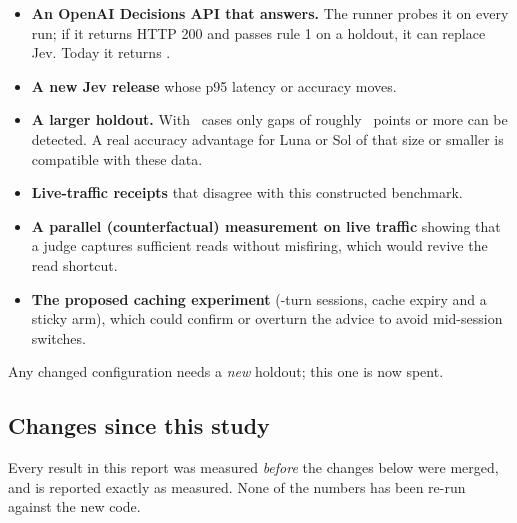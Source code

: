 \begin{itemize}
  \item \textbf{An OpenAI Decisions API that answers.} The runner probes it on every run; if it returns
    HTTP 200 and passes rule 1 on a holdout, it can replace Jev. Today it returns
    \HoldProbeStatus.
  \item \textbf{A new Jev release} whose p95 latency or accuracy moves.
  \item \textbf{A larger holdout.} With \HoldN\ cases only gaps of roughly \HoldMinDetectPts\ points or
    more can be detected. A real accuracy advantage for Luna or Sol of that size or smaller is
    compatible with these data.
  \item \textbf{Live-traffic receipts} that disagree with this constructed benchmark.
  \item \textbf{A parallel (counterfactual) measurement on live traffic} showing that a judge captures
    sufficient reads without misfiring, which would revive the read shortcut.
  \item \textbf{The proposed caching experiment} (\CaPropTurns-turn sessions, cache expiry and a sticky
    arm), which could confirm or overturn the advice to avoid mid-session switches.
\end{itemize}
Any changed configuration needs a \emph{new} holdout; this one is now spent.

\subsection{Changes since this study}\label{sec:since}

\begin{caution}[title={Measured before these changes}]
Every result in this report was measured \emph{before} the changes below were merged, and is reported
exactly as measured. None of the numbers has been re-run against the new code.
\end{caution}

